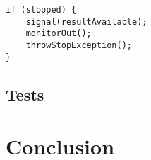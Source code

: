 \documentclass{article}
\begin{document}
    \begin{lstlisting}[caption={Excrept of the stop condition checking in the \texttt{ComputationManager::getNextResult()} method.}, captionpos=b, label=lst:1]
if (stopped) {
    signal(resultAvailable);
    monitorOut();
    throwStopException();
}
    \end{lstlisting}

    \subsection*{Tests}

    \section*{Conclusion}
\end{document}
